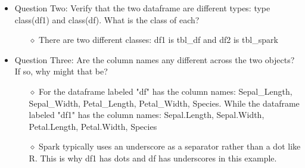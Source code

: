 \documentclass[12pt,letterpaper]{article}
\begin{document}
\begin{itemize}
    \item Question Two: Verify that the two dataframe are different types: type class(df1) and class(df). What is the class of each?
        \begin{itemize}
            \item[$\diamond$] There are two different classes: df1 is tbl\_df and df2 is tbl\_spark
        \end{itemize}
    \item Question Three: Are the column names any different across the two objects? If so, why might that be?
        \begin{itemize}
             \item[$\diamond$] For the dataframe labeled "df" has the column names: Sepal\_Length, Sepal\_Width, Petal\_Length, Petal\_Width, Species. While the dataframe labeled "df1" has the column names: Sepal.Length, Sepal.Width, Petal.Length, Petal.Width, Species
        \end{itemize}
        \begin{itemize}
             \item[$\diamond$] Spark typically uses an underscore as a separator rather than a dot like R. This is why df1 has dots and df has underscores in this example. 
        \end{itemize}
        \end{itemize}
\end{document}
